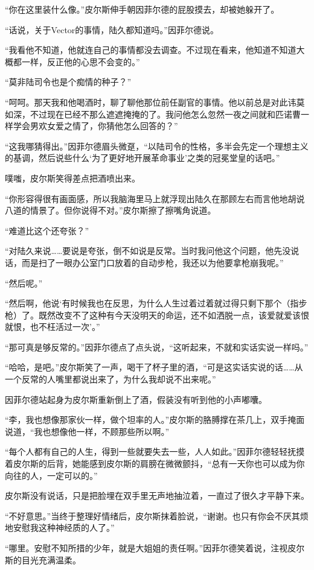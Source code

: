 “你在这里装什么像。”皮尔斯伸手朝因菲尔德的屁股摸去，却被她躲开了。

“话说，关于Vector的事情，陆久都知道吗。”因菲尔德说。

“我看他不知道，他就连自己的事情都没去调查。不过现在看来，他知道不知道大概都一样，反正他的心思不会变的。”

“莫非陆司令也是个痴情的种子？”

“呵呵。那天我和他喝酒时，聊了聊他那位前任副官的事情。他以前总是对此讳莫如深，不过现在已经不那么遮遮掩掩的了。我问他怎么忽然一夜之间就和匹诺曹一样学会男欢女爱之情了，你猜他怎么回答的？”

“这我哪猜得出。”因菲尔德眉头微趸，“以陆司令的性格，多半会先定一个理想主义的基调，然后说些什么‘为了更好地开展革命事业’之类的冠冕堂皇的话吧。”

噗嗤，皮尔斯笑得差点把酒喷出来。

“你形容得很有画面感，所以我脑海里马上就浮现出陆久在那顾左右而言他地胡说八道的情景了。但你说得不对。”皮尔斯擦了擦嘴角说道。

“难道比这个还夸张？”

“对陆久来说……要说是夸张，倒不如说是反常。当时我问他这个问题，他先没说话，而是扫了一眼办公室门口放着的自动步枪，我还以为他要拿枪崩我呢。”

“然后呢。”

“然后啊，他说‘有时候我也在反思，为什么人生过着过着就过得只剩下那个（指步枪）了。既然改变不了这种有今天没明天的命运，还不如洒脱一点，该爱就爱该恨就恨，也不枉活过一次’。”

“那可真是够反常的。”因菲尔德点了点头说，“这听起来，不就和实话实说一样吗。”

“哈哈，是吧。”皮尔斯笑了一声，喝干了杯子里的酒，“可是这实话实说的话……从一个反常的人嘴里都说出来了，为什么我却说不出来呢。”

因菲尔德站起身为皮尔斯重新倒上了酒，假装没有听到他的小声嘟囔。

“李，我也想像那家伙一样，做个坦率的人。”皮尔斯的胳膊撑在茶几上，双手掩面说道，“我也想像他一样，不顾那些所以啊。”

“每个人都有自己的人生，得到一些就要失去一些，人人如此。”因菲尔德轻轻抚摸着皮尔斯的后背，她能感到皮尔斯的肩膀在微微颤抖，“总有一天你也可以成为你向往的人，一定可以的。”

皮尔斯没有说话，只是把脸埋在双手里无声地抽泣着，一直过了很久才平静下来。

“不好意思。”当终于整理好情绪后，皮尔斯抹着脸说，“谢谢。也只有你会不厌其烦地安慰我这种神经质的人了。”

“哪里。安慰不知所措的少年，就是大姐姐的责任啊。”因菲尔德笑着说，注视皮尔斯的目光充满温柔。

